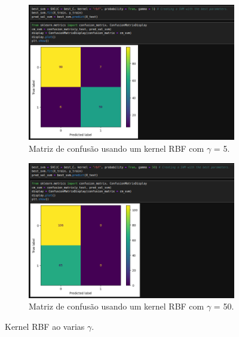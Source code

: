 \documentclass{article} %
\begin{document}
\begin{figure}[H]
      \begin{subfigure}{0.75\textwidth} %
         \centering %
         \includegraphics[width=\linewidth]{gamma5.png} %
         \caption{Matriz de confusão usando um kernel RBF com \(\gamma\) = 5.} %
         \label{fig:exemplo2} %
   \end{subfigure}
      \hfill %
      \begin{subfigure}{0.75\textwidth} %
         \centering %
         \includegraphics[width=\linewidth]{gamma50.png} %
         \caption{Matriz de confusão usando um kernel RBF com \(\gamma\) = 50.} %
         \label{fig:exemplo3} %
      \end{subfigure}

      \caption{Kernel RBF ao varias \(\gamma\).} %
      \label{fig:imagens} %
   \end{figure}
\end{document}
